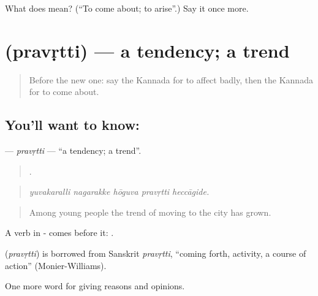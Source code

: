 \begin{tcolorbox}[breakable,colback=teal!4,colframe=teal!35!black,title={Before you move on}]
What does  mean? (\textquotedblleft{}To come about; to arise\textquotedblright{}.) Say it once more.
\end{tcolorbox}
\section[\texorpdfstring{\kn{ಪ್ರವೃತ್ತಿ} (pravṛtti)}{ಪ್ರವೃತ್ತಿ (pravṛtti)}]{ (pravṛtti) — a tendency; a trend}

\label{lesson:KA-C385-pravrtti}



\begin{quote}
Before the new one: say the Kannada for to affect badly, then the Kannada for to come about.
\end{quote}

\subsection*{You'll want to know: }
\textbf{} — \emph{pravṛtti} — \textquotedblleft{}a tendency; a trend\textquotedblright{}.

\begin{quote}
    .
\end{quote}

\begin{quote}
\emph{yuvakaralli nagarakke hōguva pravṛtti heccāgide.}
\end{quote}

\begin{quote}
Among young people the trend of moving to the city has grown.
\end{quote}

A verb in - comes before it:  .

\begin{cousinweb}
\textbf{} (\emph{pravṛtti}) is borrowed from Sanskrit \emph{pravṛtti}, \textquotedblleft{}coming forth, activity, a course of action\textquotedblright{} (Monier-Williams).
\end{cousinweb}

\begin{grammarlens}[title={What you've built}]
One more word for giving reasons and opinions.
\end{grammarlens}

